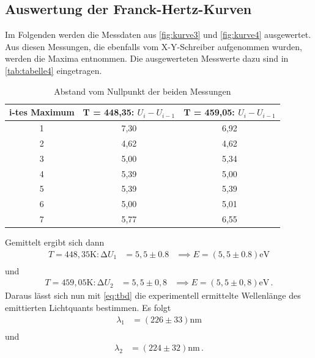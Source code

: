 \subsection{Auswertung der Franck-Hertz-Kurven}

Im Folgenden werden die Messdaten aus \autoref{fig:kurve3} und \autoref{fig:kurve4} ausgewertet.
Aus diesen Messungen, die ebenfalls vom X-Y-Schreiber aufgenommen wurden, werden die Maxima entnommen.
Die ausgewerteten Messwerte dazu sind in \autoref{tab:tabelle4} eingetragen.

\begin{table} [H]
  \centering
  \caption{Abstand vom Nullpunkt der beiden Messungen}
  \label{tab:tabelle4}
  \begin{tabular}{c c c}
      \toprule
      i-tes Maximum &  T = 448,35: $U_i - U_{i-1}$ & T = 459,05: $U_i - U_{i-1}$\\
      \midrule 
      1 & 7,30 & 6,92 \\
      2 & 4,62 & 4,62 \\
      3 & 5,00 & 5,34 \\
      4 & 5,39 & 5,00 \\
      5 & 5,39 & 5,39 \\
      6 & 5,00 & 5,01 \\
      7 & 5,77 & 6,55 \\
      \bottomrule
  \end{tabular}
\end{table}


Gemittelt ergibt sich dann
\begin{align*}
  T = 448,35 \unit\K: \increment U_1 &= 5,5 \pm 0.8  &\implies E = (5,5 \pm 0.8)\unit\eV \\
\end{align*}
und 
\begin{align*}
  T = 459,05 \unit\K: \increment U_2 &= 5,5 \pm 0,8  &\implies E = (5,5 \pm 0,8)\unit\eV \, .
\end{align*}
Daraus lässt sich nun mit \autoref{eq:tbd} die experimentell ermittelte Wellenlänge des emittierten Lichtquants bestimmen.
Es folgt
\begin{align*}
  \lambda_1 &= (226 \pm 33) \unit\nm \\
\end{align*}
und
\begin{align*}
  \lambda_2 &= (224 \pm 32) \unit\nm \, .
\end{align*}